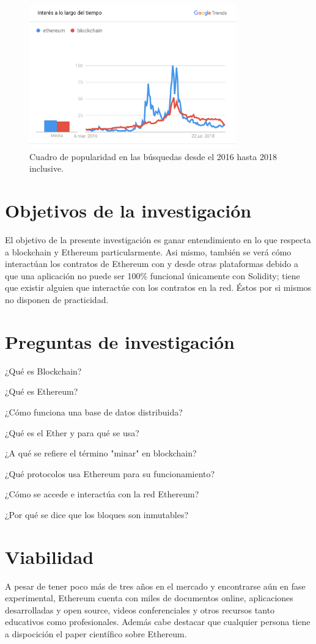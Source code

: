 \begin{figure}[htbp!] 
\centering    
\includegraphics[width=0.8\textwidth]{ethereum-trends}
\caption[EthereumTrends]{Cuadro de popularidad en las búsquedas desde el 2016 hasta 2018
inclusive.}
\label{fig:ethereum-trends}
\end{figure}

\section{Objetivos de la investigación}
El objetivo de la presente investigación es ganar entendimiento en lo que respecta a blockchain
y Ethereum particularmente. Asi mismo, también se verá cómo interactúan los contratos de Ethereum
con y desde otras plataformas debido a que una aplicación no puede ser 100\% funcional únicamente 
con Solidity; tiene que existir alguien que interactúe con los contratos en la red. Éstos por si 
mismos no disponen de practicidad.

\section{Preguntas de investigación}
¿Qué es Blockchain?

¿Qué es Ethereum?

¿Cómo funciona una base de datos distribuida?

¿Qué es el Ether y para qué se usa?

¿A qué se refiere el término "minar" en blockchain?

¿Qué protocolos usa Ethereum para su funcionamiento?

¿Cómo se accede e interactúa con la red Ethereum?

¿Por qué se dice que los bloques son inmutables?

\section{Viabilidad}
A pesar de tener poco más de tres años en el mercado y encontrarse aún en fase experimental,
Ethereum cuenta con miles de documentos online, aplicaciones desarrolladas y open source, videos
conferenciales y otros recursos tanto educativos como profesionales. Además cabe destacar que 
cualquier persona tiene a dispocición el paper científico sobre Ethereum.


